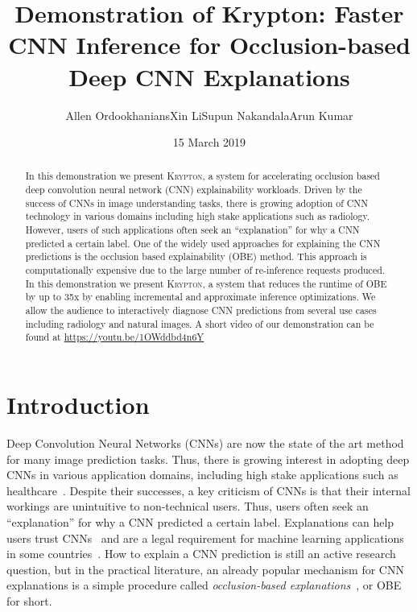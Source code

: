 \documentclass{vldb}
\newcommand{\system}{\textsc{Krypton}}
\begin{document}
\title{Demonstration of Krypton: Faster CNN Inference for Occlusion-based Deep CNN Explanations}


\author{
\alignauthor Allen Ordookhanians\hspace{10mm}Xin Li\hspace{10mm}Supun Nakandala\hspace{10mm}Arun Kumar\\
}

\date{15 March 2019}


\maketitle

\begin{abstract}
In this demonstration we present \system, a system for accelerating occlusion based deep convolution neural network (CNN) explainability workloads.
Driven by the success of CNNs in image understanding tasks, there is growing adoption of CNN technology in various domains including high stake applications such as radiology.
However, users of such applications often seek an ``explanation'' for why a CNN predicted a certain label.
One of the widely used approaches for explaining the CNN predictions is the occlusion based explainability (OBE) method.
This approach is computationally expensive due to the large number of re-inference requests produced.
In this demonstration we present \system, a system that reduces the runtime of OBE by up to 35x by enabling incremental and approximate inference optimizations.
We allow the audience to interactively diagnose CNN predictions from several use cases including radiology and natural images.
A short video of our demonstration can be found at \url{https://youtu.be/1OWddbd4n6Y}
\end{abstract}


\section{Introduction}\label{introduction}
Deep Convolution Neural Networks (CNNs) are now the state of the art method for many image prediction tasks. Thus, there is growing interest in adopting deep CNNs in various application domains, including high stake applications such as healthcare~\cite{kermany2018identifying,fdaretinopathy}.
Despite their successes, a key criticism of CNNs is that their internal workings are unintuitive to non-technical users. Thus, users often seek an ``explanation'' for why a CNN predicted a certain label. Explanations can help users trust CNNs~\cite{ribeiro2016should} and are a legal requirement for machine learning applications in some countries~\cite{gdpr}. How to explain a CNN prediction is still an active research question, but in the practical literature, an already popular mechanism for CNN explanations is a simple procedure called \textit{occlusion-based explanations}~\cite{zeiler2014visualizing}, or OBE for short.
\end{document}
